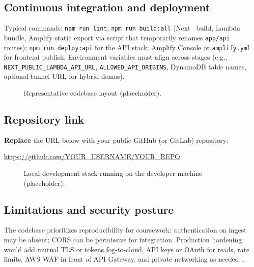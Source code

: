 \documentclass[conference]{IEEEtran}
\begin{document}
\subsection{Continuous integration and deployment}
Typical commands: \texttt{npm run lint}; \texttt{npm run build:all} (Next~\cite{nextjs2025} build, Lambda bundle, Amplify static export via script that temporarily renames \texttt{app/api} routes); \texttt{npm run deploy:api} for the API stack; Amplify Console or \texttt{amplify.yml} for frontend publish. Environment variables must align across stages (e.g., \texttt{NEXT\_PUBLIC\_LAMBDA\_API\_URL}, \texttt{ALLOWED\_API\_ORIGINS}, DynamoDB table names, optional tunnel URL for hybrid demos).

\begin{figure}[!t]
\centering
{}
\caption{Representative codebase layout (placeholder).}
\label{fig:code}
\end{figure}

\subsection{Repository link}
\textbf{Replace} the URL below with your public GitHub (or GitLab) repository:

\begin{center}
\url{https://github.com/YOUR_USERNAME/YOUR_REPO}
\end{center}

\begin{figure}[!t]
\centering
{}
\caption{Local development stack running on the developer machine (placeholder).}
\label{fig:local}
\end{figure}

\subsection{Limitations and security posture}
The codebase prioritizes reproducibility for coursework: authentication on ingest may be absent; CORS can be permissive for integration. Production hardening would add mutual TLS or tokens fog-to-cloud, API keys or OAuth for reads, rate limits, AWS WAF in front of API Gateway, and private networking as needed~\cite{owasp2023api}.
\end{document}
